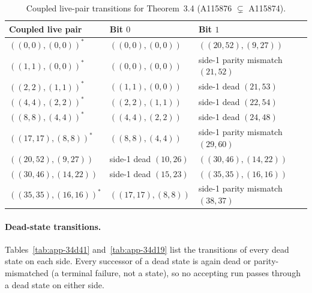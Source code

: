 \documentclass[11pt]{article}
\begin{document}
\begin{table}[ht]
\centering
\small
\begin{tabular}{lll}
\hline
Coupled live pair & Bit $0$ & Bit $1$ \\
\hline
$((0,0),(0,0))^*$ & $((0,0),(0,0))$ & $((20,52),(9,27))$ \\
$((1,1),(0,0))^*$ & $((0,0),(0,0))$ & side-1 parity mismatch $(21,52)$ \\
$((2,2),(1,1))^*$ & $((1,1),(0,0))$ & side-1 dead $(21,53)$ \\
$((4,4),(2,2))^*$ & $((2,2),(1,1))$ & side-1 dead $(22,54)$ \\
$((8,8),(4,4))^*$ & $((4,4),(2,2))$ & side-1 dead $(24,48)$ \\
$((17,17),(8,8))^*$ & $((8,8),(4,4))$ & side-1 parity mismatch $(29,60)$ \\
$((20,52),(9,27))$ & side-1 dead $(10,26)$ & $((30,46),(14,22))$ \\
$((30,46),(14,22))$ & side-1 dead $(15,23)$ & $((35,35),(16,16))$ \\
$((35,35),(16,16))^*$ & $((17,17),(8,8))$ & side-1 parity mismatch $(38,37)$ \\
\hline
\end{tabular}
\caption{Coupled live-pair transitions for Theorem~3.4 (A115876 $\subsetneq$ A115874).}
\label{tab:app-34}
\end{table}

\paragraph{Dead-state transitions.}
Tables~\ref{tab:app-34d41} and~\ref{tab:app-34d19} list the transitions of every dead state on each side. Every successor of a dead state is again dead or parity-mismatched (a terminal failure, not a state), so no accepting run passes through a dead state on either side.
\end{document}
